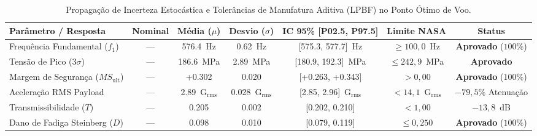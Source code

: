 \begin{table}[htbp]
\centering
\caption{Propagação de Incerteza Estocástica e Tolerâncias de Manufatura Aditiva (LPBF) no Ponto Ótimo de Voo.}
\label{tab:incerteza_monte_carlo_voo}
\begin{tabular}{lcccccc}
\toprule
\textbf{Parâmetro / Resposta} & \textbf{Nominal} & \textbf{Média ($\mu$)} & \textbf{Desvio ($\sigma$)} & \textbf{IC 95\% [P02.5, P97.5]} & \textbf{Limite NASA} & \textbf{Status} \\
\midrule
Frequência Fundamental ($f_1$) & — & 576.4~Hz & 0.62~Hz & [575.3, 577.7]~Hz & $\ge 100{,}0$~Hz & \textbf{Aprovado} ($100\%$) \\
Tensão de Pico ($3\sigma$) & — & 186.6~MPa & 2.89~MPa & [180.9, 192.3]~MPa & $\le 242{,}9$~MPa & \textbf{Aprovado} \\
Margem de Segurança ($MS_{\text{ult}}$) & — & +0.302 & 0.020 & [+0.263, +0.343] & $> 0{,}00$ & \textbf{Aprovado} ($100\%$) \\
Aceleração RMS Payload & — & 2.89~G$_{\text{rms}}$ & 0.028~G$_{\text{rms}}$ & [2.85, 2.96]~G$_{\text{rms}}$ & $< 14{,}1$~G$_{\text{rms}}$ & $-79{,}5\%$ Atenuação \\
Transmissibilidade ($T$) & — & 0.205 & 0.002 & [0.202, 0.210] & $< 1{,}00$ & $-13{,}8$~dB \\
Dano de Fadiga Steinberg ($D$) & — & 0.098 & 0.010 & [0.079, 0.119] & $\le 0{,}250$ & \textbf{Aprovado} ($100\%$) \\
\bottomrule
\end{tabular}
\end{table}
